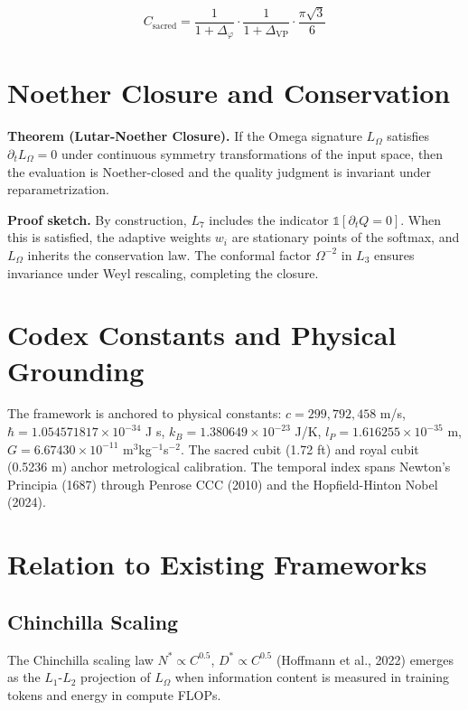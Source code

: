 \documentclass[11pt]{article}
\theoremstyle{plain}
\begin{document}
\begin{equation}
C_{\text{sacred}} = \frac{1}{1 + \Delta_\varphi} \cdot \frac{1}{1 + \Delta_{\text{VP}}} \cdot \frac{\pi\sqrt{3}}{6}
\end{equation}


\section{Noether Closure and Conservation}

\textbf{Theorem (Lutar-Noether Closure).} If the Omega signature \( L_\Omega \) satisfies \( \partial_t L_\Omega = 0 \) under continuous symmetry transformations of the input space, then the evaluation is Noether-closed and the quality judgment is invariant under reparametrization.

\textbf{Proof sketch.} By construction, \( L_7 \) includes the indicator \( \mathbb{1}[\partial_t Q = 0] \). When this is satisfied, the adaptive weights \( w_i \) are stationary points of the softmax, and \( L_\Omega \) inherits the conservation law. The conformal factor \( \Omega^{-2} \) in \( L_3 \) ensures invariance under Weyl rescaling, completing the closure.


\section{Codex Constants and Physical Grounding}

The framework is anchored to physical constants: \( c = 299{,}792{,}458 \) m/s, \( \hbar = 1.054571817 \times 10^{-34} \) J s, \( k_B = 1.380649 \times 10^{-23} \) J/K, \( l_P = 1.616255 \times 10^{-35} \) m, \( G = 6.67430 \times 10^{-11} \) m\(^3\)kg\(^{-1}\)s\(^{-2}\). The sacred cubit (1.72 ft) and royal cubit (0.5236 m) anchor metrological calibration. The temporal index spans Newton's Principia (1687) through Penrose CCC (2010) and the Hopfield-Hinton Nobel (2024).


\section{Relation to Existing Frameworks}

\subsection{Chinchilla Scaling}

The Chinchilla scaling law \( N^* \propto C^{0.5} \), \( D^* \propto C^{0.5} \) (Hoffmann et al., 2022) emerges as the \( L_1 \)-\( L_2 \) projection of \( L_\Omega \) when information content is measured in training tokens and energy in compute FLOPs.
\end{document}
